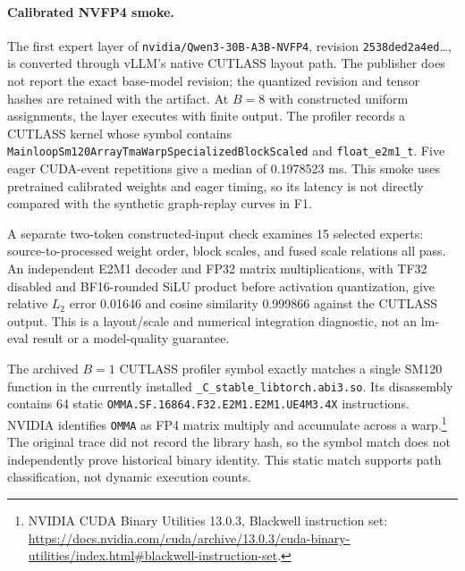 \documentclass[10pt,twocolumn]{article}
\begin{document}
\paragraph{Calibrated NVFP4 smoke.}
The first expert layer of \texttt{nvidia/Qwen3-30B-A3B-NVFP4}, revision
\texttt{2538ded2a4ed}\ldots, is converted through vLLM's native CUTLASS
layout path. The publisher does not report the exact base-model revision;
the quantized revision and tensor hashes are retained with the artifact.
At $B=8$ with constructed uniform assignments, the layer executes with
finite output. The profiler records a CUTLASS kernel whose symbol contains
\texttt{MainloopSm120ArrayTma}\allowbreak\texttt{WarpSpecializedBlockScaled}
and \texttt{float\_e2m1\_t}. Five eager CUDA-event repetitions give a
median of 0.1978523 ms. This smoke uses pretrained calibrated weights and
eager timing, so its latency is not directly compared with the synthetic
graph-replay curves in F1.

A separate two-token constructed-input check examines 15 selected experts:
source-to-processed weight order, block scales, and fused scale relations
all pass. An independent E2M1 decoder and FP32 matrix multiplications, with
TF32 disabled and BF16-rounded SiLU product before activation quantization,
give relative $L_2$ error 0.01646 and cosine similarity 0.999866 against the
CUTLASS output. This is a layout/scale and numerical integration diagnostic,
not an lm-eval result or a model-quality guarantee.

The archived $B=1$ CUTLASS profiler symbol exactly matches a single
SM120 function in the currently installed
\texttt{\_C\_stable\_libtorch.abi3.so}. Its disassembly contains 64 static
\texttt{OMMA.SF.16864.F32.}\allowbreak\texttt{E2M1.E2M1.UE4M3.4X}
instructions. NVIDIA identifies \texttt{OMMA} as FP4 matrix multiply and
accumulate across a warp.\footnote{NVIDIA CUDA Binary Utilities 13.0.3,
Blackwell instruction set:
\url{https://docs.nvidia.com/cuda/archive/13.0.3/cuda-binary-utilities/index.html\#blackwell-instruction-set}.}
The original trace did not record the library hash, so the symbol match
does not independently prove historical binary identity. This static
match supports path classification, not dynamic execution counts.
\end{document}
